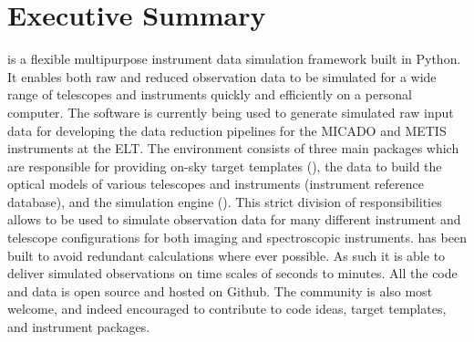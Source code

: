 \section{Executive Summary}
\ScopeSim{} is a flexible multipurpose instrument data simulation framework built in Python.
It enables both raw and reduced observation data to be simulated for a wide range of telescopes and instruments quickly and efficiently on a personal computer.
The software is currently being used to generate simulated raw input data for developing the data reduction pipelines for the MICADO and METIS instruments at the ELT.
The \ScopeSim{} environment consists of three main packages which are responsible for providing on-sky target templates (\ScopeSimtemplates{}), the data to build the optical models of various telescopes and instruments (instrument reference database), and the simulation engine (\ScopeSim{}).
This strict division of responsibilities allows \ScopeSim{} to be used to simulate observation data for many different instrument and telescope configurations for both imaging and spectroscopic instruments.
\ScopeSim{} has been built to avoid redundant calculations where ever possible.
As such it is able to deliver simulated observations on time scales of seconds to minutes.
All the code and data is open source and hosted on Github.
The community is also most welcome, and indeed encouraged to contribute to code ideas, target templates, and instrument packages.
